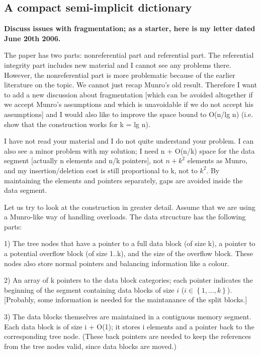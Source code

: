 \documentclass{DIKU-article}
\newcommand{\set}[1]{\left\{#1\right\}}
\begin{document}
\subsection{A compact semi-implicit dictionary}

\noindent\textbf{Discuss issues with fragmentation; as a starter, here
is my letter dated June 20th 2006.}

The paper has two parts: nonreferential part and referential part. The
referential integrity part includes new material and I cannot see any
problems there. However, the nonreferential part is more problematic
because of the earlier literature on the topic. We cannot just recap
Munro's old result. Therefore I want to add a new discussion about
fragmentation [which can be avoided altogether if we accept Munro's
assumptions and which is unavoidable if we do not accept his
assumptions] and I would also like to improve the space bound to
O(n/lg n) (i.e. show that the construction works for k = lg n).

I have not read your material and I do not quite understand your
problem. I can also see a minor problem with my solution; I need n +
O(n/k) space for the data segment [actually n elements and n/k
pointers], not $n + k^2$ elements as Munro, and my insertion/deletion
cost is still proportional to k, not to $k^2$. By maintaining the
elements and pointers separately, gaps are avoided inside the data
segment.

Let us try to look at the construction in greater detail. Assume that we are using a Munro-like way of handling overloads. The data strcucture has the following parts:

1) The tree nodes that have a pointer to a full data block (of size k), a pointer to a potential overflow block (of size  1..k), and the size of the overflow block. These nodes also store normal pointers and balancing information like a colour.

2) An array of k pointers to the data block categories; each pointer indicates the beginning of the segment containing data blocks of size $i$ ($i \in \set{1,\ldots,k}$). [Probably, some information is needed for the maintanance of the split blocks.]

3) The data blocks themselves are maintained in a contiguous memory segment. Each data block is of size i + O(1); it stores i elements and a pointer back to the corresponding tree node. (These back pointers are needed to keep the references from the tree nodes valid, since data blocks are moved.)
\end{document}

